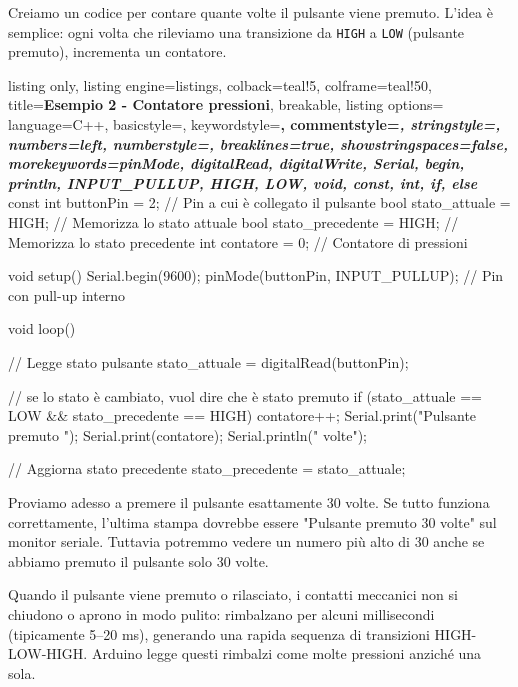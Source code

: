 Creiamo un codice per contare quante volte il pulsante viene premuto. L'idea è semplice: ogni volta che rileviamo una transizione da \texttt{HIGH} a \texttt{LOW} (pulsante premuto), incrementa un contatore.

\begin{tcblisting}{
    listing only,
    listing engine=listings,
    colback=teal!5,
    colframe=teal!50,
    title=\textbf{Esempio 2 - Contatore pressioni},
    breakable,
    listing options={
        language=C++,
        basicstyle=\ttfamily\small,
        keywordstyle=\color{blue!80!black}\bfseries,
        commentstyle=\color{green!50!black}\itshape,
        stringstyle=\color{orange!80!black},
        numbers=left,
        numberstyle=\tiny\color{gray},
        breaklines=true,
        showstringspaces=false,
        morekeywords={pinMode, digitalRead, digitalWrite, Serial, begin, println, INPUT\_PULLUP, HIGH, LOW, void, const, int, if, else}
    }
}
const int buttonPin = 2;      // Pin a cui è collegato il pulsante
bool stato_attuale = HIGH;    // Memorizza lo stato attuale
bool stato_precedente = HIGH; // Memorizza lo stato precedente
int contatore = 0;            // Contatore di pressioni

void setup() {
    Serial.begin(9600);                
    pinMode(buttonPin, INPUT_PULLUP);  // Pin con pull-up interno
}

void loop() {
    // Legge stato pulsante
    stato_attuale = digitalRead(buttonPin);

    // se lo stato è cambiato, vuol dire che è stato premuto
    if (stato_attuale == LOW && stato_precedente == HIGH) {              
        contatore++;
        Serial.print("Pulsante premuto ");
        Serial.print(contatore);
        Serial.println(" volte");
    }

    // Aggiorna stato precedente
    stato_precedente = stato_attuale; 
}
\end{tcblisting}

\begin{tcolorbox}[colback=red!4, colframe=red!60, title=\textbf{Attenzione: il risultato non è quello atteso!}]

    Proviamo adesso a premere il pulsante esattamente 30 volte. Se tutto funziona correttamente, l'ultima stampa dovrebbe essere "Pulsante premuto 30 volte" sul monitor seriale. Tuttavia potremmo vedere un numero più alto di 30 anche se abbiamo premuto il pulsante solo 30 volte.
\end{tcolorbox}

Quando il pulsante viene premuto o rilasciato, i contatti meccanici non si chiudono o aprono in modo pulito: rimbalzano per alcuni millisecondi (tipicamente 5–20 ms), generando una rapida sequenza di transizioni HIGH-LOW-HIGH. Arduino legge questi rimbalzi come molte pressioni anziché una sola.


